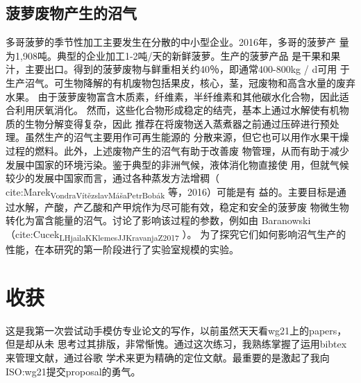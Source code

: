 \documentclass[11pt]{article}
\begin{document}
\subsection{菠萝废物产生的沼气}
\label{sec:orge97174f}
多哥菠萝的季节性加工主要发生在分散的中小型企业。2016年，多哥的菠萝产
量为1,908吨。典型的企业加工1-2吨/天的新鲜菠萝。生产的菠萝产品
是干果和果汁，主要出口。得到的菠萝废物与鲜重相关约40％，即通常400-800kg / d可用
于生产沼气。可生物降解的有机废物包括果皮，核心，茎，冠废物和高含水量的废弃水果。
由于菠萝废物富含木质素，纤维素，半纤维素和其他碳水化合物，因此适合利用厌氧消化。
然而，这些化合物形成稳定的结壳，基本上通过水解使有机物质的生物分解变得复杂，因此
推荐在将废物送入蒸煮器之前通过压碎进行预处理。虽然生产的沼气主要用作可再生能源的
分散来源，但它也可以用作水果干燥过程的燃料。此外，上述废物产生的沼气有助于改善废
物管理，从而有助于减少发展中国家的环境污染。鉴于典型的非洲气候，液体消化物直接使
用，但就气候较少的发展中国家而言，通过各种蒸发方法增稠（ cite:Marek\textsubscript{Vondra}\textsubscript{Vítězslav}\textsubscript{Máša}\textsubscript{Petr}\textsubscript{Bobák} 等，2016）可能是有
益的。主要目标是通过水解，产酸，产乙酸和产甲烷作为尽可能有效，稳定和安全的菠萝废
物微生物转化为富含能量的沼气。讨论了影响该过程的参数，例如由
Baranowski（cite:Cucek\textsubscript{L}\textsubscript{Hjaila}\textsubscript{K}\textsubscript{Klemes}\textsubscript{JJ}\textsubscript{Kravanja}\textsubscript{Z}\textsubscript{2017} ）。
为了探究它们如何影响沼气生产的性能，在本研究的第一阶段进行了实验室规模的实验。

\section{收获}
\label{sec:orga7f8f55}
这是我第一次尝试动手模仿专业论文的写作，以前虽然天天看wg21上的papers，但是却从未
思考过其排版，非常惭愧。通过这次练习，我熟练掌握了运用bibtex来管理文献，通过谷歌
学术来更为精确的定位文献。最重要的是激起了我向ISO:wg21提交proposal的勇气。
\end{document}
